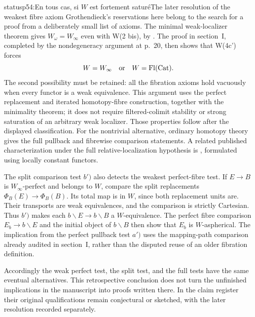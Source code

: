 \begin{dcomment}{status}{p54:En tous cas, si $W$ est fortement saturé}{The later resolution of the weakest fibre axiom}
Grothendieck's reservations here belong to the search for a proof from a deliberately small list of axioms. The minimal weak-localizer theorem gives $W_\omega=W_\infty$ even with W(2 bis), by \citet[Theorem~6.1.18]{Cisinski2006}. The proof in section~I, completed by the nondegeneracy argument at p.~20, then shows that W(4c') forces
\[
 W=W_\infty\quad\hbox{or}\quad W=\operatorname{Fl}(\mathrm{Cat}).
\]
The second possibility must be retained: all the fibration axioms hold vacuously when every functor is a weak equivalence. This argument uses the perfect replacement and iterated homotopy-fibre construction, together with the minimality theorem; it does not require filtered-colimit stability or strong saturation of an arbitrary weak localizer. Those properties follow after the displayed classification. For the nontrivial alternative, ordinary homotopy theory gives the full pullback and fibrewise comparison statements. A related published characterization under the full relative-localization hypothesis is \citet[Theorem~6.4.22 and Remark~6.4.23]{Cisinski2006}, formulated using locally constant functors.

The split comparison test $b')$ also detects the weakest perfect-fibre test. If $E\to B$ is $W_\infty$-perfect and belongs to $W$, compare the split replacements $\Phi_B(E)\to\Phi_B(B)$. Its total map is in $W$, since both replacement units are. Their transports are weak equivalences, and the comparison is strictly Cartesian. Thus $b')$ makes each $b\backslash E\to b\backslash B$ a $W$-equivalence. The perfect fibre comparison $E_b\to b\backslash E$ and the initial object of $b\backslash B$ then show that $E_b$ is $W$-aspherical. The implication from the perfect pullback test $a')$ uses the mapping-path comparison already audited in section~I, rather than the disputed reuse of an older fibration definition.

Accordingly the weak perfect test, the split test, and the full tests have the same eventual alternatives. This retrospective conclusion does not turn the unfinished implications in the manuscript into proofs written there. In the claim register their original qualifications remain conjectural or sketched, with the later resolution recorded separately.
\end{dcomment}


